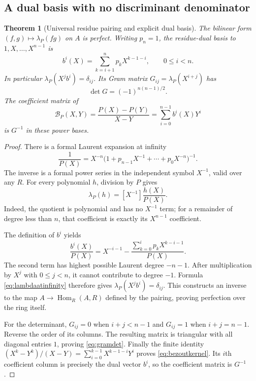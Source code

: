 \documentclass[11pt,letterpaper]{article}
\numberwithin{equation}{section}
\newtheorem{theorem}{Theorem}[section]
\theoremstyle{definition}
\theoremstyle{remark}
\begin{document}
\subsection{A dual basis with no discriminant denominator}
\begin{theorem}[Universal residue pairing and explicit dual basis]\label{thm:residuepairing}
The bilinear form $(f,g)\mapsto\lambda_P(fg)$ on $A$ is perfect.
Writing $p_n=1$, the residue-dual basis to $1,X,\ldots,X^{n-1}$ is
\begin{equation}\label{eq:dualbasis}
 b^i(X)=\sum_{k=i+1}^n p_kX^{k-1-i},\qquad 0\le i<n.
\end{equation}
In particular $\lambda_P(X^jb^i)=\delta_{ij}$. Its Gram matrix
$G_{ij}=\lambda_P(X^{i+j})$ has
\begin{equation}\label{eq:gramdet}
 \det G=(-1)^{n(n-1)/2}.
\end{equation}
The coefficient matrix of
\begin{equation}\label{eq:bezoutkernel}
 \mathcal B_P(X,Y)=\frac{P(X)-P(Y)}{X-Y}
                 =\sum_{i=0}^{n-1}b^i(X)Y^i
\end{equation}
is $G^{-1}$ in these power bases.
\end{theorem}
\begin{proof}
There is a formal Laurent expansion at infinity
\[
 \frac1{P(X)}=X^{-n}
    \bigl(1+p_{n-1}X^{-1}+\cdots+p_0X^{-n}\bigr)^{-1}.
\]
The inverse is a formal power series in the independent symbol $X^{-1}$,
valid over any $R$. For every polynomial $h$, division by $P$ gives
\begin{equation}\label{eq:lambdaatinfinity}
 \lambda_P(h)=[X^{-1}]\frac{h(X)}{P(X)}.
\end{equation}
Indeed, the quotient is polynomial and has no $X^{-1}$ term; for a
remainder of degree less than $n$, that coefficient is exactly its
$X^{n-1}$ coefficient.

The definition of $b^i$ yields
\[
 \frac{b^i(X)}{P(X)}
 =X^{-i-1}-\frac{\sum_{k=0}^i p_kX^{k-i-1}}{P(X)}.
\]
The second term has highest possible Laurent degree $-n-1$. After
multiplication by $X^j$ with $0\le j<n$, it cannot contribute to degree
$-1$. Formula \eqref{eq:lambdaatinfinity} therefore gives
$\lambda_P(X^jb^i)=\delta_{ij}$. This constructs an inverse to the map
$A\to\operatorname{Hom}_R(A,R)$ defined by the pairing, proving perfection
over the ring itself.

For the determinant, $G_{ij}=0$ when $i+j<n-1$ and $G_{ij}=1$ when
$i+j=n-1$. Reverse the order of its columns. The resulting matrix is
triangular with all diagonal entries $1$, proving \eqref{eq:gramdet}.
Finally the finite identity
$(X^k-Y^k)/(X-Y)=\sum_{i=0}^{k-1}X^{k-1-i}Y^i$ proves
\eqref{eq:bezoutkernel}. Its $i$th coefficient column is precisely the
dual vector $b^i$, so the coefficient matrix is $G^{-1}$.
\end{proof}
\end{document}
